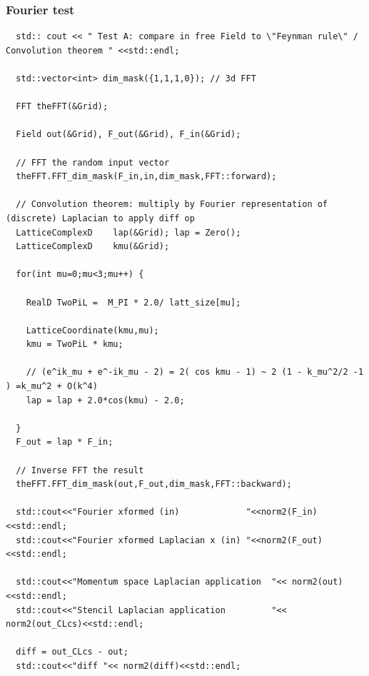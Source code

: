 \documentclass[pdf,ps,8pt]{beamer}
\newcommand{\miniscule}{\fontsize{3pt}{4pt}\selectfont}
\begin{document}
\begin{frame}[fragile]\small\frametitle{ Fourier test}

{\miniscule
\begin{verbatim}
  std:: cout << " Test A: compare in free Field to \"Feynman rule\" / Convolution theorem " <<std::endl;

  std::vector<int> dim_mask({1,1,1,0}); // 3d FFT

  FFT theFFT(&Grid);

  Field out(&Grid), F_out(&Grid), F_in(&Grid);

  // FFT the random input vector
  theFFT.FFT_dim_mask(F_in,in,dim_mask,FFT::forward);

  // Convolution theorem: multiply by Fourier representation of (discrete) Laplacian to apply diff op
  LatticeComplexD    lap(&Grid); lap = Zero();
  LatticeComplexD    kmu(&Grid); 

  for(int mu=0;mu<3;mu++) {

    RealD TwoPiL =  M_PI * 2.0/ latt_size[mu];

    LatticeCoordinate(kmu,mu);
    kmu = TwoPiL * kmu;

    // (e^ik_mu + e^-ik_mu - 2) = 2( cos kmu - 1) ~ 2 (1 - k_mu^2/2 -1 ) =k_mu^2 + O(k^4)
    lap = lap + 2.0*cos(kmu) - 2.0;
    
  }  
  F_out = lap * F_in;
  
  // Inverse FFT the result
  theFFT.FFT_dim_mask(out,F_out,dim_mask,FFT::backward);
  
  std::cout<<"Fourier xformed (in)             "<<norm2(F_in)<<std::endl;
  std::cout<<"Fourier xformed Laplacian x (in) "<<norm2(F_out)<<std::endl;
  
  std::cout<<"Momentum space Laplacian application  "<< norm2(out)<<std::endl;
  std::cout<<"Stencil Laplacian application         "<< norm2(out_CLcs)<<std::endl;
    
  diff = out_CLcs - out;
  std::cout<<"diff "<< norm2(diff)<<std::endl;
  \end{verbatim}
}
\end{frame}
\end{document}
